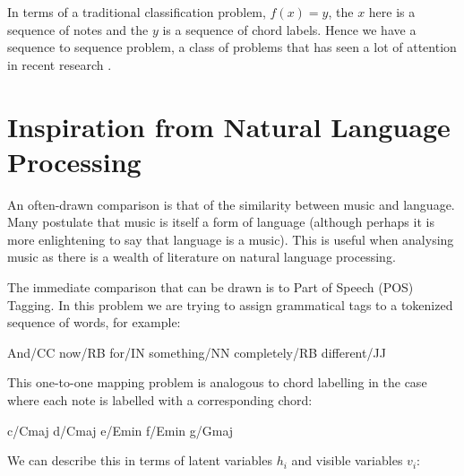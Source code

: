 \documentclass[bsc,singlespacing,logo, parskip, deptreport]{infthesis}
\begin{document}
In terms of a traditional classification problem, $f(x) = y$, the $x$ here is a sequence of notes and the $y$ is a sequence of chord labels. Hence we have a sequence to sequence problem, a class of problems that has seen a lot of attention in recent research \cite{sutskever2014sequence} \cite{luong2015multi} \cite{duvsek2016sequence}.

\section{Inspiration from Natural Language Processing}

An often-drawn comparison is that of the similarity between music and language. Many postulate that music is itself a form of language \cite{cohen2008music} (although perhaps it is more enlightening to say that language is a music). This is useful when analysing music as there is a wealth of literature on natural language processing.

The immediate comparison that can be drawn is to Part of Speech (POS) Tagging. In this problem we are trying to assign grammatical tags to a tokenized sequence of words, for example:

And/CC now/RB for/IN something/NN completely/RB different/JJ

This one-to-one mapping problem is analogous to chord labelling in the case where each note is labelled with a corresponding chord:

c/Cmaj d/Cmaj e/Emin f/Emin g/Gmaj

We can describe this in terms of latent variables $h_i$ and visible variables $v_i$:

\begin{center}
\end{center}
\end{document}
